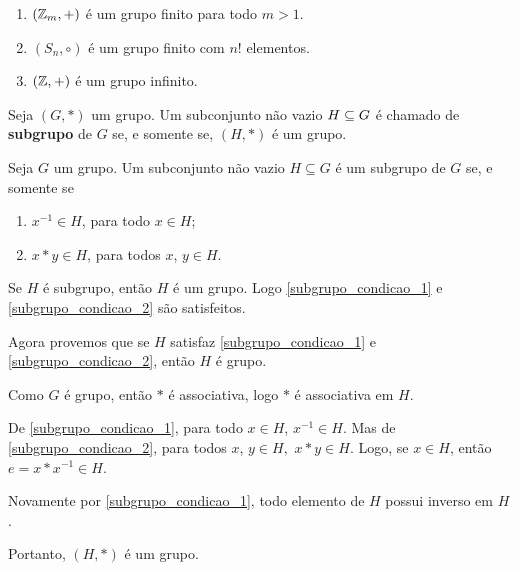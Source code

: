 \begin{exemplos}
	\begin{enumerate}[label={\arabic*})]
		\item $(\mathbb{Z}_m, +)$ {\'e} um grupo finito para todo $m>1$.
		\item $(S_n, \circ)$ \'e um grupo finito com $n!$ elementos.
		\item $(\mathbb{Z}, +)$ {\'e} um grupo infinito.
	\end{enumerate}	
\end{exemplos}

\begin{definicao}
	Seja $(G,*)$ um grupo. Um subconjunto n{\~a}o vazio $H\subseteq G$ {\'e} chamado de \textbf{subgrupo} de $G$ se, e somente se, $(H,*)$ {\'e} um grupo.
\end{definicao}

\begin{proposicao}
	Seja $G$ um grupo. Um subconjunto n{\~a}o vazio $H\subseteq G$ {\'e} um subgrupo de $G$ se, e somente se
	\begin{enumerate}[label={\roman*})]
		\item\label{subgrupo_condicao_1} $x^{-1}\in H$, para todo $x \in H$;
		\item\label{subgrupo_condicao_2} $x*y\in H$, para todos $x$, $y \in H$.
	\end{enumerate}
\end{proposicao}
\begin{prova}
	Se $H$ {\'e} subgrupo, ent{\~a}o $H$ {\'e} um grupo. Logo \ref{subgrupo_condicao_1} e \ref{subgrupo_condicao_2} s{\~a}o satisfeitos.

	Agora provemos que se $H$ satisfaz \ref{subgrupo_condicao_1} e \ref{subgrupo_condicao_2}, ent{\~a}o $H$ {\'e} grupo.

	Como $G$ {\'e} grupo, ent{\~a}o $*$ {\'e} associativa, logo $*$ {\'e} associativa em $H$.

	De \ref{subgrupo_condicao_1}, para todo $x \in H$, $x^{-1}\in H$. Mas de \ref{subgrupo_condicao_2}, para todos $x$, $y \in H,$ $x*y \in H$. Logo, se $x\in H$, ent{\~a}o $e = x*x^{-1} \in H$.

	Novamente por \ref{subgrupo_condicao_1}, todo elemento de $H$ possui inverso em $H$.

	Portanto, $(H,*)$ {\'e} um grupo.
\end{prova}



